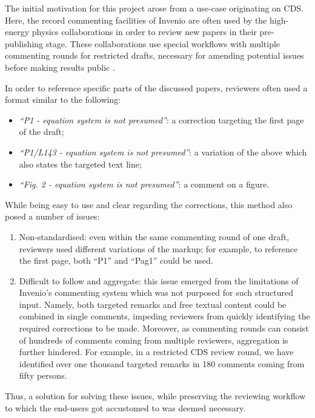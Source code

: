 
The initial motivation for this project arose from a use-case originating on
CDS.  Here, the record commenting facilities of Invenio are often used by the
high-energy physics collaborations in order to review new papers in their
pre-publishing stage.  These collaborations use special workflows with multiple
commenting rounds for restricted drafts, necessary for amending potential
issues before making results public \cite{ref:ludmila}.

In order to reference specific parts of the discussed papers, reviewers often
used a format similar to the following:
  \begin{itemize}
      \item \textit{``P1 - equation system is not presumed''}: a correction
          targeting the first page of the draft;
      \item \textit{``P1/L143 - equation system is not presumed''}: a variation of
        the above which also states the targeted text line;
      \item \textit{``Fig. 2 - equation system is not presumed''}: a comment on a
        figure.
  \end{itemize}
While being easy to use and clear regarding the corrections, this method also
posed a number of issues:
  \begin{enumerate}
    \item Non-standardised: even within the same commenting round of one draft,
      reviewers used different variations of the markup; for example, to
      reference the first page, both ``P1'' and ``Pag1'' could be used.
    \item Difficult to follow and aggregate: this issue emerged from the
      limitations of Invenio's commenting system which was not purposed for such
      structured input. Namely, both targeted remarks and free textual content
      could be combined in single comments, impeding reviewers from quickly
      identifying the required corrections to be made. Moreover, as commenting
      rounds can consist of hundreds of comments coming from multiple reviewers,
      aggregation is further hindered. For example, in a restricted CDS review
      round, we have identified over one thousand targeted remarks in 180
      comments coming from fifty persons.
  \end{enumerate}
Thus, a solution for solving these issues, while preserving the reviewing
workflow to which the end-users got accustomed to was deemed necessary.

